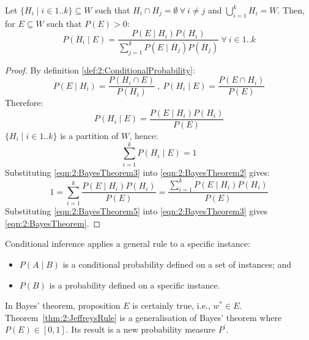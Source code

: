 \begin{thm}
  \label{thm:2:BayesTheorem}

  Let $\{H_i \mid i \in 1 .. k\}\subseteq W$ such that $H_i \cap H_j = \emptyset\
    \forall\ i \neq j$ and $\bigcup_{i = 1}^{k} H_i = W$.
  Then, for $E \subseteq W$ such that $P(E) > 0$:
  \begin{equation}
    \label{eqn:2:BayesTheorem}
    P(H_i \mid E)
    = \frac{P(E \mid H_i)P(H_i)}{\sum_{j = 1}^{k} P(E \mid H_j) P(H_j)}\
    \forall\ i \in 1 .. k
  \end{equation}
  \begin{proof}
    By definition \ref{def:2:ConditionalProbability}:
    \begin{equation}
      \label{eqn:2:BayesTheorem1}
      P(E \mid H_i) = \frac{P(H_i \cap E)}{P(H_i)}\ ,\
      P(H_i \mid E) = \frac{P(E \cap H_i)}{P(E)}
    \end{equation}
    Therefore:
    \begin{equation}
      \label{eqn:2:BayesTheorem2}
      P(H_i \mid E) = \frac{P(E \mid H_i) P(H_i)}{P(E)}
    \end{equation}
    $\{H_i\mid i\in 1 .. k\}$ is a partition of $W$, hence:
    \begin{equation}
      \label{eqn:2:BayesTheorem3}
      \sum_{i = 1}^{k}P(H_i \mid E) = 1
    \end{equation}
    Substituting \ref{eqn:2:BayesTheorem3} into \ref{eqn:2:BayesTheorem2} gives:
    \begin{equation}
      \label{eqn:2:BayesTheorem5}
      1 = \sum_{i = 1}^{k}\frac{P(E \mid H_i)P(H_i)}{P(E)}
      = \frac{\sum_{i = 1}^{k}
        P(E \mid H_i) P(H_i)}{P(E)}
    \end{equation}
    Substituting
    \ref{eqn:2:BayesTheorem5} into \ref{eqn:2:BayesTheorem3} gives
    \ref{eqn:2:BayesTheorem}.
  \end{proof}
\end{thm}

Conditional inference applies a general rule to a specific instance:
\begin{itemize}
  \item $P(A \mid B)$ is a conditional probability defined on a set of instances; and
  \item $P(B)$ is a probability defined on a specific instance.
\end{itemize}

In Bayes' theorem, proposition $E$ is certainly true, i.e., $w^* \in E$.
Theorem~\ref{thm:2:JeffreysRule} is a generalisation of Bayes' theorem where
$P(E) \in [0, 1]$.
Its result is a new probability measure $P^\prime$.


